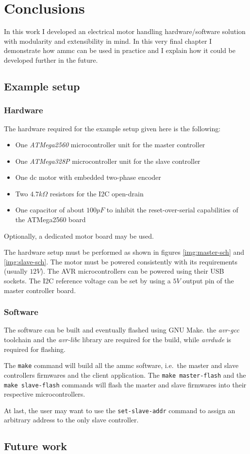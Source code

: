\chapter{Conclusions}
\label{ch:conclusions}
In this work I developed an electrical motor handling hardware/software
solution with modularity and extensibility in mind. In this very final chapter
I demonstrate how ammc can be used in practice and I explain how it could be
developed further in the future.

\section{Example setup}

\subsection{Hardware}
The hardware required for the example setup given here is the following:
\begin{itemize}
  \item One \emph{ATMega2560} microcontroller unit for the master controller
  \item One \emph{ATMega328P} microcontroller unit for the slave controller
  \item One dc motor with embedded two-phase encoder
  \item Two $4.7 k\Omega$ resistors for the I2C open-drain
  \item One capacitor of about $100 pF$ to inhibit the reset-over-serial
    capabilities of the ATMega2560 board
\end{itemize}
Optionally, a dedicated motor board may be used.

The hardware setup must be performed as shown in figures \ref{img:master-sch}
and \ref{img:slave-sch}.
The motor must be powered consistently with its requirements (usually $12 V$).
The AVR microcontrollers can be powered using their USB sockets. The I2C
reference voltage can be set by using a $5 V$ output pin of the master
controller board.

\subsection{Software}
The software can be built and eventually flashed using GNU Make. the
\emph{avr-gcc} toolchain and the \emph{avr-libc} library are required for the
build, while \emph{avrdude} is required for flashing.

The \texttt{make} command will build all the ammc software, i.e.\ the master
and slave controllers firmwares and the client application. The \texttt{make
master-flash} and the \texttt{make slave-flash} commands will flash the master
and slave firmwares into their respective microcontrollers.

At last, the user may want to use the \texttt{set-slave-addr} command to assign
an arbitrary address to the only slave controller.

\section{Future work}

